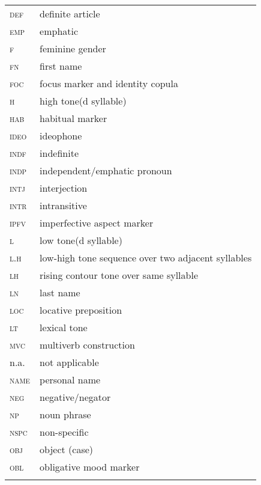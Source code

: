 \begin{tabularx}{.45\textwidth}{lQ}
 \textsc{def} & definite article \\
 \textsc{emp} & emphatic \\
 \textsc{f} & feminine gender \\
 \textsc{fn} & first name \\
 \textsc{foc} & focus marker and identity copula \\
 \textsc{h} & high tone(d syllable) \\
 \textsc{hab} & habitual marker \\
 \textsc{ideo} & ideophone \\
 \textsc{indf} & indefinite \\
 \textsc{indp} & independent/emphatic pronoun \\
 \textsc{intj} & interjection \\
 \textsc{intr} & intransitive \\
\textsc{ipfv} & imperfective aspect marker \\
 \textsc{l} & low tone(d syllable) \\
 \textsc{l.h} & low-high tone sequence over two adjacent syllables \\
\textsc{lh} & rising contour tone over same syllable\\
\textsc{ln} & last name\\
\textsc{loc} & locative preposition\\
\textsc{lt} & lexical tone\\
\textsc{mvc} & multiverb construction\\
n.a. & not applicable\\
\textsc{name} & personal name\\
\textsc{neg} & negative/negator\\
\textsc{np} & noun phrase\\
\textsc{nspc} & non-specific\\
\textsc{obj} & object (case)\\
\textsc{obl} & obligative mood marker\\
\\
\end{tabularx}

